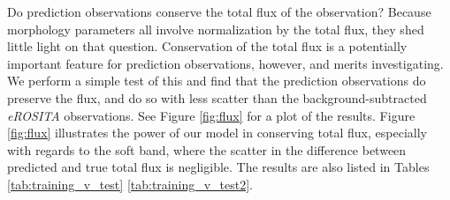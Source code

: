 Do prediction observations conserve the total flux of the observation? Because morphology parameters all involve normalization by the total flux, they shed little light on that question. Conservation of the total flux is a potentially important feature for prediction observations, however, and merits investigating. We perform a simple test of this and find that the prediction observations do preserve the flux, and do so with less scatter than the background-subtracted \textit{eROSITA} observations. See Figure \ref{fig:flux} for a plot of the results. Figure \ref{fig:flux} illustrates the power of our model in conserving total flux, especially with regards to the soft band, where the scatter in the difference between predicted and true total flux is negligible. The results are also listed in Tables \ref{tab:training_v_test} \ref{tab:training_v_test2}.

